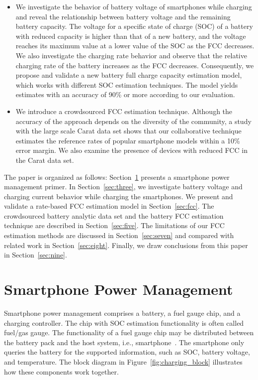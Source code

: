\documentclass[journal]{IEEEtran}
\begin{document}
\begin{itemize}

\item We investigate the behavior of battery voltage of smartphones while charging and reveal the relationship between battery voltage and the remaining battery capacity. The voltage for a specific state of charge (SOC) of a battery with reduced capacity is higher than that of a new battery, and the voltage reaches its maximum value at a lower value of the SOC as the FCC decreases.   We also investigate the charging rate behavior and observe that the relative charging rate of the battery increases as the FCC decreases. Consequently, we propose and validate a new battery full charge capacity estimation model, which works with different SOC estimation techniques. The model yields estimates with an accuracy of 90\% or more according to our evaluation. 

\item We introduce a crowdsourced FCC estimation technique. Although the accuracy of the approach depends on the diversity of the community, a study with the large scale Carat data set shows that our collaborative technique estimates the reference rates of popular smartphone models within a 10\% error margin. We also examine the presence of devices with reduced FCC in the Carat data set. 
\end{itemize}

The paper is organized as follows: Section~\ref{sec:soc} presents a smartphone power management primer. In Section~\ref{sec:three}, we investigate battery voltage and charging current behavior while charging the smartphones. We present and validate a rate-based FCC estimation model in Section~\ref{sec:fcc}. The crowdsourced battery analytic data set and the battery FCC estimation technique are described in Section~\ref{sec:five}.  The limitations of our FCC estimation methods are discussed in Section~\ref{sec:seven} and compared with related work  in Section~\ref{sec:eight}. Finally, we draw conclusions from this paper in Section~\ref{sec:nine}.


\section{Smartphone Power Management}
\label{sec:soc}
Smartphone power management comprises a battery, a fuel gauge chip, and a charging controller. The chip with SOC estimation functionality is often called fuel/gas gauge. The functionality of a fuel gauge chip may be distributed between the battery pack and the host system, i.e., smartphone~\cite{fuelsel}. The smartphone only queries the battery for the supported information, such as SOC, battery voltage, and temperature. The block diagram in Figure~\ref{fig:charging_block} illustrates how these components work together. 
\end{document}
